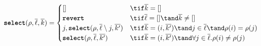 \documentclass[10pt]{article}
\begin{document}
\[
    \select(\rho, \overline{\ell}, \overline{k}) =
    \begin{cases}
        [] & \tif \overline{k} = [] \\
        \revert & \tif \overline{\ell} = [] \tand \overline{k} \neq [] \\
        j, \select(\rho, \overline{\ell} \setminus j, \overline{k'}) & \tif \overline{k} = (i, \overline{k'}) \tand j \in \overline{\ell} \tand \rho(i) = \rho(j) \\
        \select(\rho, \overline{\ell}, \overline{k'}) & \tif \overline{k} = (i, \overline{k'}) \tand \forall j \in \overline{\ell}. \rho(i) \neq \rho(j) \\
    \end{cases}
\]

\begin{mathpar}
\end{mathpar}
\end{document}
